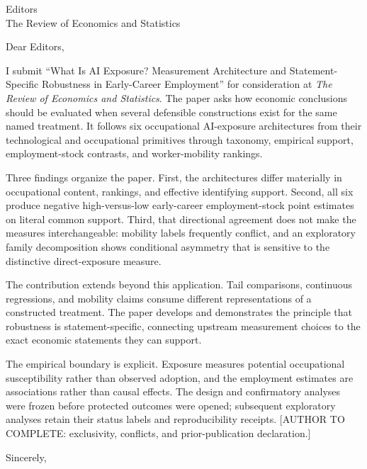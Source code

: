 \documentclass[12pt,letterpaper]{letter}
\begin{document}
\begin{letter}{Editors\\The Review of Economics and Statistics}
\opening{Dear Editors,}

I submit ``What Is AI Exposure? Measurement Architecture and Statement-Specific Robustness in Early-Career Employment'' for consideration at \emph{The Review of Economics and Statistics}. The paper asks how economic conclusions should be evaluated when several defensible constructions exist for the same named treatment. It follows six occupational AI-exposure architectures from their technological and occupational primitives through taxonomy, empirical support, employment-stock contrasts, and worker-mobility rankings.

Three findings organize the paper. First, the architectures differ materially in occupational content, rankings, and effective identifying support. Second, all six produce negative high-versus-low early-career employment-stock point estimates on literal common support. Third, that directional agreement does not make the measures interchangeable: mobility labels frequently conflict, and an exploratory family decomposition shows conditional asymmetry that is sensitive to the distinctive direct-exposure measure.

The contribution extends beyond this application. Tail comparisons, continuous regressions, and mobility claims consume different representations of a constructed treatment. The paper develops and demonstrates the principle that robustness is statement-specific, connecting upstream measurement choices to the exact economic statements they can support.

The empirical boundary is explicit. Exposure measures potential occupational susceptibility rather than observed adoption, and the employment estimates are associations rather than causal effects. The design and confirmatory analyses were frozen before protected outcomes were opened; subsequent exploratory analyses retain their status labels and reproducibility receipts. [AUTHOR TO COMPLETE: exclusivity, conflicts, and prior-publication declaration.]

\closing{Sincerely,}
\end{letter}
\end{document}
